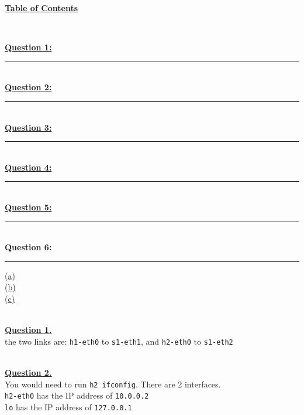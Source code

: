 \documentclass[12pt]{article}
\begin{document}
\begin{center}
	\hypertarget{toc}{\LARGE \underline{\textbf{Table of Contents}}}\\
\end{center}

\hyperlink{1}{\textbf{Question 1:}}
\vspace{1mm}
\hrule
~\\

\hyperlink{2}{\textbf{Question 2:}}
\vspace{1mm}
\hrule
~\\

\hyperlink{3}{\textbf{Question 3:}}
\vspace{1mm}
\hrule
~\\

\hyperlink{4}{\textbf{Question 4:}}
\vspace{1mm}
\hrule
~\\

\hyperlink{5}{\textbf{Question 5:}}
\vspace{1mm}
\hrule
~\\

{\textbf{Question 6:}}
\vspace{1mm}
\hrule
\vspace{1mm}
\hyperlink{6.1}{(a)}\\
\hyperlink{6.2}{(b)}\\
\hyperlink{6.3}{(c)}\\
~\\

\newpage

\hyperlink{toc}{\hypertarget{1}{\LARGE \underline{\textbf{Question 1.}}}}\\
the two links are: \texttt{h1-eth0} to \texttt{s1-eth1}, and \texttt{h2-eth0} to \texttt{s1-eth2}

~\\\hyperlink{toc}{\hypertarget{2}{\LARGE \underline{\textbf{Question 2.}}}}\\
You would need to run \texttt{h2 ifconfig}. There are 2 interfaces.\\
\texttt{h2-eth0} has the IP address of \texttt{10.0.0.2}\\
\texttt{lo} has the IP address of \texttt{127.0.0.1}\\
\end{document}
